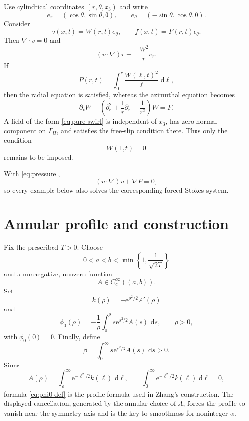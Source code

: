 \documentclass[10pt]{amsart}
\theoremstyle{definition}
\newcommand{\e}{\mathrm e}
\newcommand{\dd}{\,\mathrm d}
\newcommand{\Gh}{\Gamma_{\!H}}
\begin{document}
Use cylindrical coordinates $(r,\theta,x_3)$ and write
\[
    e_r=(\cos\theta,\sin\theta,0),
    \qquad
    e_\theta=(-\sin\theta,\cos\theta,0).
\]
Consider
\begin{equation}
\label{eq:pure-swirl}
    v(x,t)=W(r,t)e_\theta,
    \qquad
    f(x,t)=F(r,t)e_\theta.
\end{equation}
Then $\nabla\cdot v=0$ and
\[
    (v\cdot\nabla)v=-\frac{W^2}{r}e_r.
\]
If
\begin{equation}
\label{eq:pressure}
    P(r,t)=\int_0^r\frac{W(\ell,t)^2}{\ell}\,\dd\ell,
\end{equation}
then the radial equation is satisfied, whereas the azimuthal equation becomes
\begin{equation}
\label{eq:scalar-standard}
    \partial_tW-
    \left(\partial_r^2+\frac1r\partial_r-\frac1{r^2}\right)W=F.
\end{equation}
A field of the form \eqref{eq:pure-swirl} is independent of $x_3$, has zero normal
component on $\Gh$, and satisfies the free-slip condition there.  Thus only the
condition
\[
    W(1,t)=0
\]
remains to be imposed.

With \eqref{eq:pressure},
\[
    (v\cdot\nabla)v+\nabla P=0,
\]
so every example below also solves the corresponding forced Stokes system.

\section{Annular profile and construction}
\label{sec:profile}

Fix the prescribed $T>0$.  Choose
\begin{equation}
\label{eq:ab-choice}
    0<a<b<\min\left\{1,\frac1{\sqrt{2T}}\right\}
\end{equation}
and a nonnegative, nonzero function
\[
    A\in C_c^\infty((a,b)).
\]
Set
\begin{equation}
\label{eq:k-def}
    k(\rho)=-\e^{\rho^2/2}A'(\rho)
\end{equation}
and
\begin{equation}
\label{eq:phi0-def}
    \phi_0(\rho)
    =-\frac1\rho\int_0^\rho s\e^{s^2/2}A(s)\,\dd s,
    \qquad \rho>0,
\end{equation}
with $\phi_0(0)=0$.  Finally, define
\begin{equation}
\label{eq:beta-def}
    \beta=\int_0^\infty s\e^{s^2/2}A(s)\,\dd s>0.
\end{equation}
Since
\[
    A(\rho)=\int_\rho^\infty\e^{-\ell^2/2}k(\ell)\,\dd\ell,
    \qquad
    \int_0^\infty\e^{-\ell^2/2}k(\ell)\,\dd\ell=0,
\]
formula \eqref{eq:phi0-def} is the profile formula used in Zhang's construction.
The displayed cancellation, generated by the annular choice of $A$, forces the
profile to vanish near the symmetry axis and is the key to smoothness for
noninteger $\alpha$.
\end{document}
